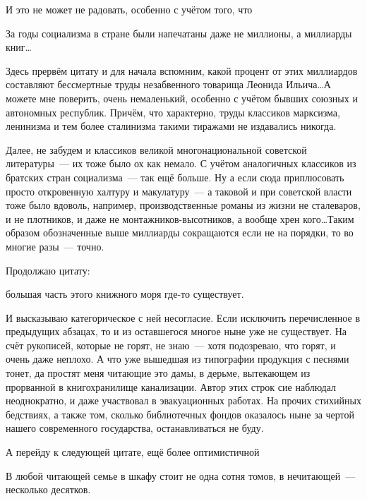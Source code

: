 И это не может не радовать, особенно с учётом того, что


\begin{shadequote}{}
За годы социализма в стране были напечатаны даже не миллионы, а миллиарды книг\dots
\end{shadequote}

Здесь прервём цитату и для начала вспомним, какой процент от этих миллиардов составляют бессмертные труды незабвенного товарища Леонида Ильича\dots А можете мне поверить, очень немаленький, особенно с учётом бывших союзных и автономных республик. Причём, что характерно, труды классиков марксизма, ленинизма и тем более сталинизма такими тиражами не издавались никогда.

Далее, не забудем и классиков великой многонациональной советской литературы~--- их тоже было ох как немало. С учётом аналогичных классиков из братских стран социализма~--- так ещё больше. Ну а если сюда приплюсовать просто откровенную халтуру и макулатуру~--- а таковой и при советской власти тоже было вдоволь, например, производственные романы из жизни не сталеваров, и не плотников, и даже не монтажников-высотников, а вообще хрен кого\dots Таким образом обозначенные выше миллиарды сокращаются если не на порядки, то во многие разы~--- точно.

Продолжаю цитату:


\begin{shadequote}{}
 большая часть этого книжного моря где-то существует.
\end{shadequote}

И высказываю категорическое с ней несогласие. Если исключить перечисленное в предыдущих абзацах, то и из оставшегося многое ныне уже не существует. На счёт рукописей, которые не горят, не знаю~--- хотя подозреваю, что горят, и очень даже неплохо. А что уже вышедшая из типографии продукция с песнями тонет, да простят меня читающие это дамы, в дерьме, вытекающем из прорванной в книгохранилище канализации. Автор этих строк сие наблюдал неоднократно, и даже участвовал в эвакуационных работах. На прочих стихийных бедствиях, а также том, сколько библиотечных фондов оказалось ныне за чертой нашего современного государства, останавливаться не буду.

А перейду к следующей цитате, ещё более оптимистичной


\begin{shadequote}{}
В любой читающей семье в шкафу стоит не одна сотня томов, в нечитающей~--- несколько десятков.
\end{shadequote}

